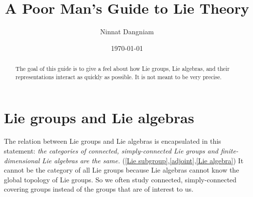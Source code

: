 \documentclass[aps,nofootinbib]{revtex4}
\begin{document}
\title{A Poor Man's Guide to Lie Theory}


\author{Ninnat Dangniam}



\date{\today}


\begin{abstract}
The goal of this guide is to give a feel about how Lie groups, Lie
algebras, and their representations interact as quickly as possible. It
is not meant to be very precise.
\end{abstract}

\maketitle

\section{Lie groups and Lie algebras}

The relation between Lie groups and Lie algebras is encapsulated in
this statement: \emph{the categories of connected, simply-connected
Lie groups and finite-dimensional Lie algebras are the same.} (\ref{Lie subgroup},\ref{adjoint},\ref{Lie algebra}) It cannot
be the category of all Lie groups because Lie algebras cannot know
the global topology of Lie groups. So we often study connected, simply-connected
covering groups instead of the groups that are of interest to us.
\end{document}
